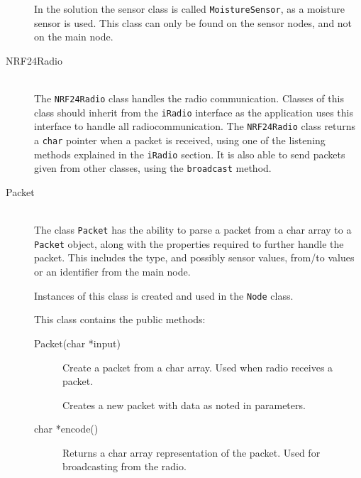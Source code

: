 \begin{description}
In the solution the sensor class is called \texttt{MoistureSensor}, as a moisture sensor is used. This class can only be found on the sensor nodes, and not on the main node.


\item[NRF24Radio] \hfill \\
The \texttt{NRF24Radio} class handles the radio communication. Classes of this class should inherit from the \texttt{iRadio} interface as the application uses this interface to handle all radiocommunication. The \texttt{NRF24Radio} class returns a \texttt{char} pointer when a packet is received, using one of the listening methods explained in the \texttt{iRadio} section. It is also able to send packets given from other classes, using the \texttt{broadcast} method.

\item[Packet] \hfill \\
The class \texttt{Packet} has the ability to parse a packet from a char array to a \texttt{Packet} object, along with the properties required to further handle the packet. This includes the type, and possibly sensor values, from/to values or an identifier from the main node.

Instances of this class is created and used in the \texttt{Node} class.

This class contains the public methods:
\begin{description}
\item[Packet(char *input)] Create a packet from a char array. Used when radio receives a packet.
\item[{\parbox[t]{0.6\linewidth}{Packet(PacketType packetTypeInput, \\ uint16\_t addresserInput, \\ uint16\_t addresseeInput, \\ uint16\_t originInput, \\ uint16\_t value1Input, \\ uint16\_t value2Input, \\ uint16\_t value3Input)}}] \item[] Creates a new packet with data as noted in parameters.
\item[char *encode()] Returns a char array representation of the packet. Used for broadcasting from the radio.
\end{description}

\end{description}



